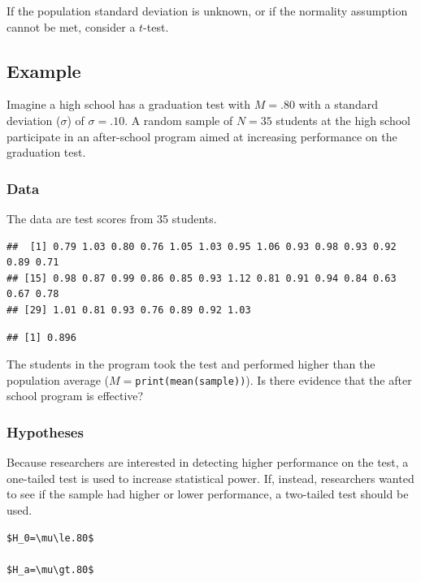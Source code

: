 \documentclass[
]{book}
\begin{document}
If the population standard deviation is unknown, or if the normality assumption cannot be met, consider a \(t\)-test.

\hypertarget{example}{%
\subsection{Example}\label{example}}

Imagine a high school has a graduation test with \(M = .80\) with a standard deviation (\(\sigma\)) of \(\sigma = .10\). A random sample of \(N = 35\) students at the high school participate in an after-school program aimed at increasing performance on the graduation test.

\hypertarget{data}{%
\subsubsection{Data}\label{data}}

The data are test scores from 35 students.

\begin{verbatim}
##  [1] 0.79 1.03 0.80 0.76 1.05 1.03 0.95 1.06 0.93 0.98 0.93 0.92 0.89 0.71
## [15] 0.98 0.87 0.99 0.86 0.85 0.93 1.12 0.81 0.91 0.94 0.84 0.63 0.67 0.78
## [29] 1.01 0.81 0.93 0.76 0.89 0.92 1.03
\end{verbatim}

\begin{verbatim}
## [1] 0.896
\end{verbatim}

The students in the program took the test and performed higher than the population average (\(M=\)\texttt{print(mean(sample))}). Is there evidence that the after school program is effective?

\hypertarget{hypotheses-1}{%
\subsubsection{Hypotheses}\label{hypotheses-1}}

Because researchers are interested in detecting higher performance on the test, a one-tailed test is used to increase statistical power. If, instead, researchers wanted to see if the sample had higher or lower performance, a two-tailed test should be used.

\begin{verbatim}
$H_0=\mu\le.80$

$H_a=\mu\gt.80$
\end{verbatim}
\end{document}
